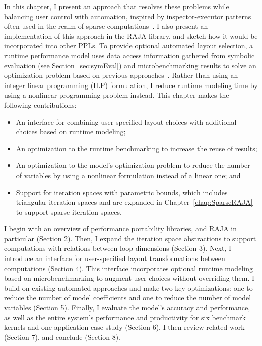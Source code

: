 In this chapter, I present an approach that resolves these problems while balancing user control with automation, inspired by inspector-executor patterns often used in the realm of sparse computations~\cite{saltz1990run,saltz1991multiprocessors,Strout14IPDPS,strout2018sparse}.
I also present an implementation of this approach in the RAJA library, and sketch how it would be incorporated into other PPLs.
To provide optional automated layout selection, a runtime performance model uses data access information gathered from symbolic evaluation (see Section~\ref{sec:symEval}) and microbenchmarking results to solve an optimization problem based on previous approaches~\cite{bixby1994automatic}.
Rather than using an integer linear programming (ILP) formulation, I reduce runtime modeling time by using a nonlinear programming problem instead. 
This chapter makes the following contributions:
\begin{itemize}
\item An interface for combining user-specified layout choices with additional choices based on runtime modeling;
\item An optimization to the runtime benchmarking to increase the reuse of results;
\item An optimization to the model's optimization problem to reduce the number of variables by using a nonlinear formulation instead of a linear one; and 
\item Support for iteration spaces with parametric bounds, which includes triangular iteration spaces and are expanded in Chapter~\ref{chap:SparseRAJA} to support sparse iteration spaces. %
\end{itemize}

I begin with an overview of performance portability libraries, and RAJA in particular (Section 2).
Then, I expand the iteration space abstractions to support computations with relations between loop dimensions (Section 3).
Next, I introduce an interface for user-specified layout transformations between computations (Section 4).
This interface incorporates optional runtime modeling based on microbenchmarking to augment user choices without overriding them.
I build on existing automated approaches and make two key optimizations: one to reduce the number of model coefficients and one to reduce the number of model variables (Section 5).
Finally, I evaluate the model's accuracy and performance, as well as the entire system's performance and productivity for six benchmark kernels and one application case study (Section 6).
I then review related work (Section 7), and conclude (Section 8).


